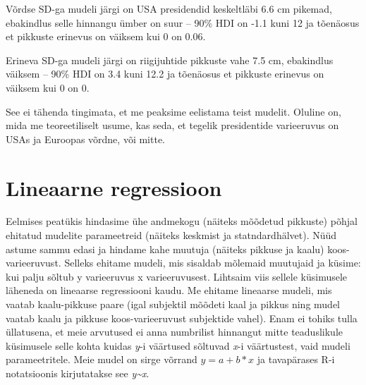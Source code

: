 \documentclass[]{book}
\newenvironment{Shaded}{\begin{snugshade}}{\end{snugshade}}
\newcommand{\CommentTok}[1]{\textcolor[rgb]{0.56,0.35,0.01}{\textit{#1}}}
\newcommand{\DataTypeTok}[1]{\textcolor[rgb]{0.13,0.29,0.53}{#1}}
\newcommand{\DecValTok}[1]{\textcolor[rgb]{0.00,0.00,0.81}{#1}}
\newcommand{\FloatTok}[1]{\textcolor[rgb]{0.00,0.00,0.81}{#1}}
\newcommand{\KeywordTok}[1]{\textcolor[rgb]{0.13,0.29,0.53}{\textbf{#1}}}
\newcommand{\NormalTok}[1]{#1}
\newcommand{\OperatorTok}[1]{\textcolor[rgb]{0.81,0.36,0.00}{\textbf{#1}}}
\newcommand{\StringTok}[1]{\textcolor[rgb]{0.31,0.60,0.02}{#1}}
\begin{document}
Võrdse SD-ga mudeli järgi on USA presidendid keskeltläbi 6.6 cm pikemad, ebakindlus selle hinnangu ümber on suur -- 90\% HDI on -1.1 kuni 12 ja tõenäosus et pikkuste erinevus on väiksem kui 0 on 0.06.

\begin{Shaded}
\end{Shaded}

Erineva SD-ga mudeli järgi on riigijuhtide pikkuste vahe 7.5 cm, ebakindlus väiksem -- 90\% HDI on 3.4 kuni 12.2 ja tõenäosus et pikkuste erinevus on väiksem kui 0 on 0.

See ei tähenda tingimata, et me peaksime eelistama teist mudelit. Oluline on, mida me teoreetiliselt usume, kas seda, et tegelik presidentide varieeruvus on USAs ja Euroopas võrdne, või mitte.

\hypertarget{lineaarne-regressioon}{%
\section*{Lineaarne regressioon}\label{lineaarne-regressioon}}

Eelmises peatükis hindasime ühe andmekogu (näiteks mõõdetud pikkuste) põhjal ehitatud mudelite parameetreid (näiteks keskmist ja statndardhälvet). Nüüd astume sammu edasi ja hindame kahe muutuja (näiteks pikkuse ja kaalu) koos-varieeruvust. Selleks ehitame mudeli, mis sisaldab mõlemaid muutujaid ja küsime: kui palju sõltub y varieeruvus x varieeruvusest. Lihtsaim viis sellele küsimusele läheneda on lineaarse regressiooni kaudu. Me ehitame lineaarse mudeli, mis vaatab kaalu-pikkuse paare (igal subjektil mõõdeti kaal ja pikkus ning mudel vaatab kaalu ja pikkuse koos-varieeruvust subjektide vahel). Enam ei tohiks tulla üllatusena, et meie arvutused ei anna numbrilist hinnangut mitte teaduslikule küsimusele selle kohta kuidas \emph{y}-i väärtused sõltuvad \emph{x}-i väärtustest, vaid mudeli parameetritele. Meie mudel on sirge võrrand \(y = a + b*x\) ja tavapärases R-i notatsioonis kirjutatakse see \emph{y\textasciitilde{}x}.
\end{document}
